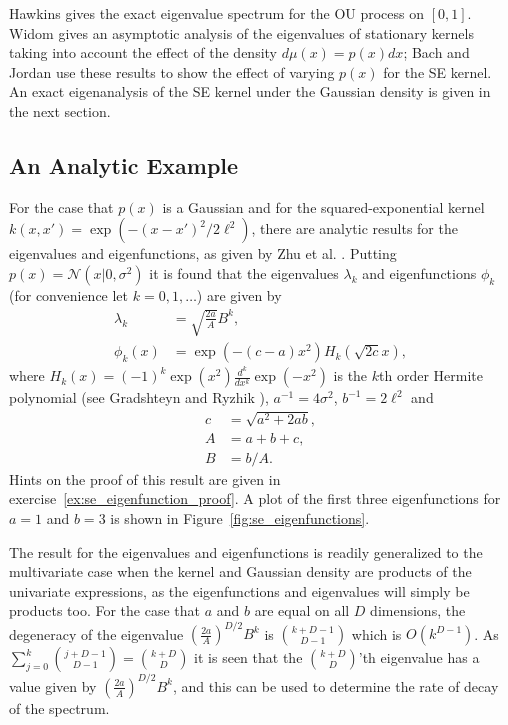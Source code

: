 \documentclass[11pt]{book}
\begin{document}
Hawkins \cite{hawkins1989} gives the exact eigenvalue spectrum for the OU process on $[0, 1]$. Widom \cite{widom1963,widom1964} gives an asymptotic analysis of the eigenvalues of stationary kernels taking into account the effect of the density $d\mu(x) = p(x)dx$; Bach and Jordan \cite{bach2002} use these results to show the effect of varying $p(x)$ for the SE kernel. An exact eigenanalysis of the SE kernel under the Gaussian density is given in the next section.

\subsection{An Analytic Example}
\label{sec:analytic_example}

For the case that $p(x)$ is a Gaussian and for the squared-exponential kernel $k(x, x') = \exp(-(x-x')^2/2\ell^2)$, there are analytic results for the eigenvalues and eigenfunctions, as given by Zhu et al. \cite{zhu1998}. Putting $p(x) = \mathcal{N}(x|0, \sigma^2)$ it is found that the eigenvalues $\lambda_k$ and eigenfunctions $\phi_k$ (for convenience let $k = 0, 1, \ldots$) are given by
\begin{align}
\label{eq:se_eigenvalues}
\lambda_k &= \sqrt{\frac{2a}{A}} B^k, \\
\phi_k(x) &= \exp\left(-(c-a)x^2\right) H_k\left(\sqrt{2c}x\right), \label{eq:se_eigenfunctions}
\end{align}
where $H_k(x) = (-1)^k \exp(x^2) \frac{d^k}{dx^k} \exp(-x^2)$ is the $k$th order Hermite polynomial (see Gradshteyn and Ryzhik \cite{gradshteyn1980}), $a^{-1} = 4\sigma^2$, $b^{-1} = 2\ell^2$ and
\begin{align}
\label{eq:se_eigen_constants}
c &= \sqrt{a^2 + 2ab}, \\
A &= a + b + c, \nonumber \\
B &= b/A. \nonumber
\end{align}
Hints on the proof of this result are given in exercise~\ref{ex:se_eigenfunction_proof}. A plot of the first three eigenfunctions for $a = 1$ and $b = 3$ is shown in Figure~\ref{fig:se_eigenfunctions}.

The result for the eigenvalues and eigenfunctions is readily generalized to the multivariate case when the kernel and Gaussian density are products of the univariate expressions, as the eigenfunctions and eigenvalues will simply be products too. For the case that $a$ and $b$ are equal on all $D$ dimensions, the degeneracy of the eigenvalue $\left(\frac{2a}{A}\right)^{D/2} B^k$ is $\binom{k+D-1}{D-1}$ which is $O(k^{D-1})$. As $\sum_{j=0}^k \binom{j+D-1}{D-1} = \binom{k+D}{D}$ it is seen that the $\binom{k+D}{D}$'th eigenvalue has a value given by $\left(\frac{2a}{A}\right)^{D/2} B^k$, and this can be used to determine the rate of decay of the spectrum.
\end{document}
